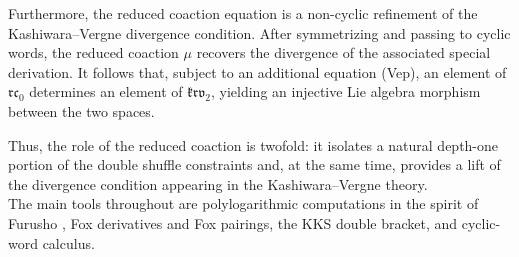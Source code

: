 \documentclass[a4paper,fleqn]{cas-sc}
\newcommand{\grt}{\mathfrak{grt}}
\newcommand{\rc}{\mathfrak{rc}}
\newcommand{\dmr}{\mathfrak{dmr}}
\newcommand{\krv}{\mathfrak{krv}}
\newcommand{\fr}{\mathfrak{fr}}
\begin{document}
Furthermore, the reduced coaction equation is a non-cyclic refinement of the Kashiwara--Vergne divergence condition. After symmetrizing and passing to cyclic words, the reduced coaction $\mu$ recovers the divergence of the associated special derivation. %
It follows that, subject to an additional equation (Vep), an element of $\rc_0$ determines an element of $\krv_2$, yielding an injective Lie algebra morphism between the two spaces.

Thus, the role of the reduced coaction is twofold: it isolates a natural depth-one portion of the
double shuffle constraints and, at the same time, provides a lift of
the divergence condition appearing in the Kashiwara--Vergne theory. \\


The main tools throughout are polylogarithmic computations in the spirit of
Furusho \cite{furusho_pentagon_2010}, Fox derivatives and Fox pairings, the KKS double
bracket, and cyclic-word calculus. 



\end{document}
